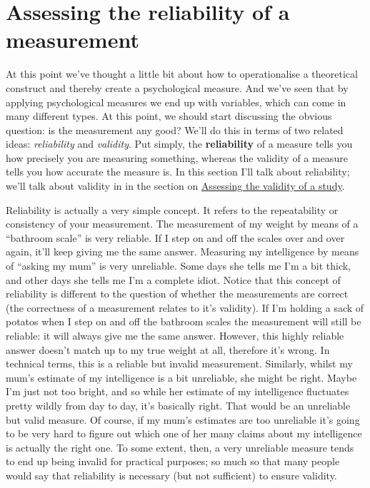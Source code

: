 \documentclass[
  letterpaper,
]{book}
\begin{document}
\hypertarget{sec-Assessing-the-reliability-of-a-measurement}{%
\section{Assessing the reliability of a
measurement}\label{sec-Assessing-the-reliability-of-a-measurement}}

At this point we've thought a little bit about how to operationalise a
theoretical construct and thereby create a psychological measure. And
we've seen that by applying psychological measures we end up with
variables, which can come in many different types. At this point, we
should start discussing the obvious question: is the measurement any
good? We'll do this in terms of two related ideas: \emph{reliability}
and \emph{validity}. Put simply, the \textbf{reliability} of a measure
tells you how precisely you are measuring something, whereas the
validity of a measure tells you how accurate the measure is. In this
section I'll talk about reliability; we'll talk about validity in in the
section on
\protect\hyperlink{assessing-the-validity-of-a-study}{Assessing the
validity of a study}.

Reliability is actually a very simple concept. It refers to the
repeatability or consistency of your measurement. The measurement of my
weight by means of a ``bathroom scale'' is very reliable. If I step on
and off the scales over and over again, it'll keep giving me the same
answer. Measuring my intelligence by means of ``asking my mum'' is very
unreliable. Some days she tells me I'm a bit thick, and other days she
tells me I'm a complete idiot. Notice that this concept of reliability
is different to the question of whether the measurements are correct
(the correctness of a measurement relates to it's validity). If I'm
holding a sack of potatos when I step on and off the bathroom scales the
measurement will still be reliable: it will always give me the same
answer. However, this highly reliable answer doesn't match up to my true
weight at all, therefore it's wrong. In technical terms, this is a
reliable but invalid measurement. Similarly, whilst my mum's estimate of
my intelligence is a bit unreliable, she might be right. Maybe I'm just
not too bright, and so while her estimate of my intelligence fluctuates
pretty wildly from day to day, it's basically right. That would be an
unreliable but valid measure. Of course, if my mum's estimates are too
unreliable it's going to be very hard to figure out which one of her
many claims about my intelligence is actually the right one. To some
extent, then, a very unreliable measure tends to end up being invalid
for practical purposes; so much so that many people would say that
reliability is necessary (but not sufficient) to ensure validity.
\end{document}

